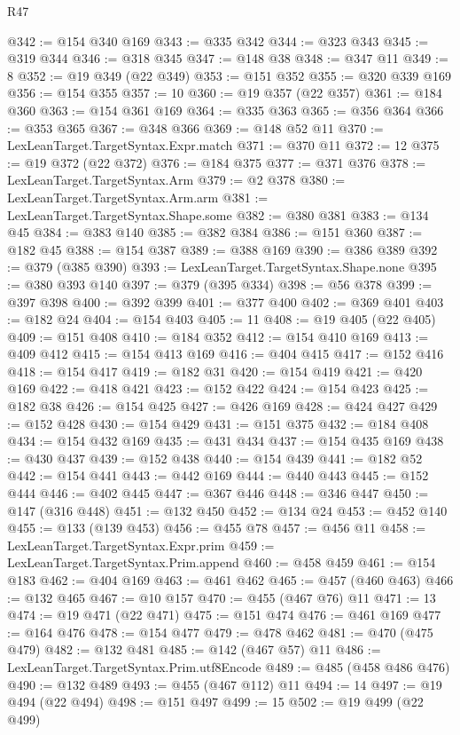 \begin{lexlean}{R47}
\begin{coremodule}
@342 := @154 @340 @169
@343 := @335 @342
@344 := @323 @343
@345 := @319 @344
@346 := @318 @345
@347 := @148 @38
@348 := @347 @11
@349 := 8
@352 := @19 @349 (@22 @349)
@353 := @151 @352
@355 := @320 @339 @169
@356 := @154 @355
@357 := 10
@360 := @19 @357 (@22 @357)
@361 := @184 @360
@363 := @154 @361 @169
@364 := @335 @363
@365 := @356 @364
@366 := @353 @365
@367 := @348 @366
@369 := @148 @52 @11
@370 := LexLeanTarget.TargetSyntax.Expr.match
@371 := @370 @11
@372 := 12
@375 := @19 @372 (@22 @372)
@376 := @184 @375
@377 := @371 @376
@378 := LexLeanTarget.TargetSyntax.Arm
@379 := @2 @378
@380 := LexLeanTarget.TargetSyntax.Arm.arm
@381 := LexLeanTarget.TargetSyntax.Shape.some
@382 := @380 @381
@383 := @134 @45
@384 := @383 @140
@385 := @382 @384
@386 := @151 @360
@387 := @182 @45
@388 := @154 @387
@389 := @388 @169
@390 := @386 @389
@392 := @379 (@385 @390)
@393 := LexLeanTarget.TargetSyntax.Shape.none
@395 := @380 @393 @140
@397 := @379 (@395 @334)
@398 := @56 @378
@399 := @397 @398
@400 := @392 @399
@401 := @377 @400
@402 := @369 @401
@403 := @182 @24
@404 := @154 @403
@405 := 11
@408 := @19 @405 (@22 @405)
@409 := @151 @408
@410 := @184 @352
@412 := @154 @410 @169
@413 := @409 @412
@415 := @154 @413 @169
@416 := @404 @415
@417 := @152 @416
@418 := @154 @417
@419 := @182 @31
@420 := @154 @419
@421 := @420 @169
@422 := @418 @421
@423 := @152 @422
@424 := @154 @423
@425 := @182 @38
@426 := @154 @425
@427 := @426 @169
@428 := @424 @427
@429 := @152 @428
@430 := @154 @429
@431 := @151 @375
@432 := @184 @408
@434 := @154 @432 @169
@435 := @431 @434
@437 := @154 @435 @169
@438 := @430 @437
@439 := @152 @438
@440 := @154 @439
@441 := @182 @52
@442 := @154 @441
@443 := @442 @169
@444 := @440 @443
@445 := @152 @444
@446 := @402 @445
@447 := @367 @446
@448 := @346 @447
@450 := @147 (@316 @448)
@451 := @132 @450
@452 := @134 @24
@453 := @452 @140
@455 := @133 (@139 @453)
@456 := @455 @78
@457 := @456 @11
@458 := LexLeanTarget.TargetSyntax.Expr.prim
@459 := LexLeanTarget.TargetSyntax.Prim.append
@460 := @458 @459
@461 := @154 @183
@462 := @404 @169
@463 := @461 @462
@465 := @457 (@460 @463)
@466 := @132 @465
@467 := @10 @157
@470 := @455 (@467 @76) @11
@471 := 13
@474 := @19 @471 (@22 @471)
@475 := @151 @474
@476 := @461 @169
@477 := @164 @476
@478 := @154 @477
@479 := @478 @462
@481 := @470 (@475 @479)
@482 := @132 @481
@485 := @142 (@467 @57) @11
@486 := LexLeanTarget.TargetSyntax.Prim.utf8Encode
@489 := @485 (@458 @486 @476)
@490 := @132 @489
@493 := @455 (@467 @112) @11
@494 := 14
@497 := @19 @494 (@22 @494)
@498 := @151 @497
@499 := 15
@502 := @19 @499 (@22 @499)

\end{coremodule}
\end{lexlean}
